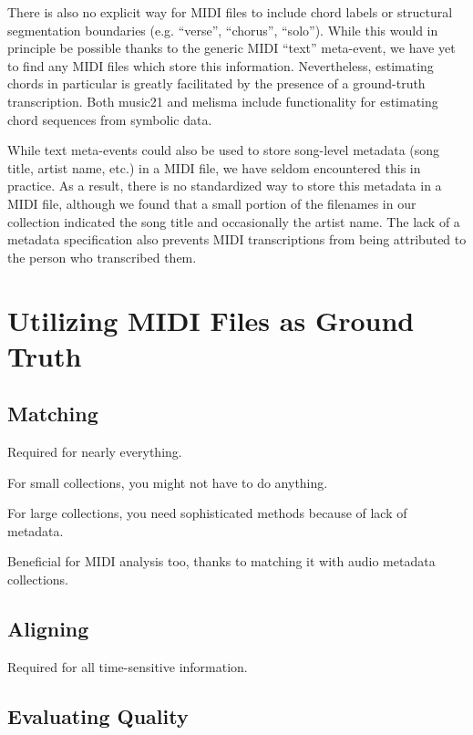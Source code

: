\documentclass{article}
\begin{document}
There is also no explicit way for MIDI files to include chord labels or structural segmentation boundaries (e.g. ``verse'', ``chorus'', ``solo'').
While this would in principle be possible thanks to the generic MIDI ``text'' meta-event, we have yet to find any MIDI files which store this information.
Nevertheless, estimating chords in particular is greatly facilitated by the presence of a ground-truth transcription.
Both music21 \cite{cuthbert2010music21} and melisma \cite{sleator2001melisma} include functionality for estimating chord sequences from symbolic data.

While text meta-events could also be used to store song-level metadata (song title, artist name, etc.) in a MIDI file, we have seldom encountered this in practice.
As a result, there is no standardized way to store this metadata in a MIDI file, although we found that a small portion of the filenames in our collection indicated the song title and occasionally the artist name.
The lack of a metadata specification also prevents MIDI transcriptions from being attributed to the person who transcribed them.

\section{Utilizing MIDI Files as Ground Truth}
\label{sec:utilizing}

\subsection{Matching}

Required for nearly everything.

For small collections, you might not have to do anything.

For large collections, you need sophisticated methods because of lack of metadata.

Beneficial for MIDI analysis too, thanks to matching it with audio metadata collections.

\subsection{Aligning}

Required for all time-sensitive information.

\subsection{Evaluating Quality}
\end{document}
